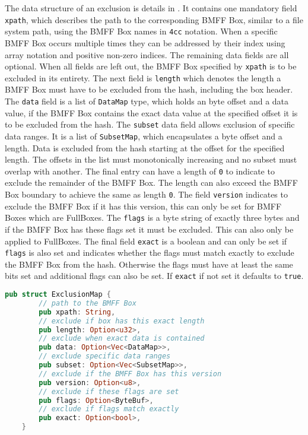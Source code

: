 The data structure of an exclusion is details in . It contains one mandatory field \texttt{xpath}, which describes the path to the corresponding BMFF Box, similar to a file system path, using the BMFF Box names in \texttt{4cc} notation. When a specific BMFF Box occurs multiple times they can be addressed by their index using array notation and positive non-zero indices. The remaining data fields are all optional. When all fields are left out, the BMFF Box specified by \texttt{xpath} is to be excluded in its entirety. The next field is \texttt{length} which denotes the length a BMFF Box must have to be excluded from the hash, including the box header. The \texttt{data} field is a list of \texttt{DataMap} type, which holds an byte offset and a data value, if the BMFF Box contains the exact data value at the specified offset it is to be excluded from the hash. The \texttt{subset} data field allows exclusion of specific data ranges. It is a list of \texttt{SubsetMap}, which encapsulates a byte offset and a length. Data is excluded from the hash starting at the offset for the specified length. The offsets in the list must monotonically increasing and no subset must overlap with another. The final entry can have a length of \texttt{0} to indicate to exclude the remainder of the BMFF Box. The length can also exceed the BMFF Box boundary to achieve the same as length \texttt{0}. The field \texttt{version} indicates to exclude the BMFF Box if it has this version, this can only be set for BMFF Boxes which are FullBoxes. The \texttt{flags} is a byte string of exactly three bytes and if the BMFF Box has these flags set it must be excluded. This can also only be applied to FullBoxes. The final field \texttt{exact} is a boolean and can only be set if \texttt{flags} is also set and indicates whether the flags must match exactly to exclude the BMFF Box from the hash. Otherwise the flags must have at least the same bits set and additional flags can also be set. If \texttt{exact} if not set it defaults to \texttt{true}.

\begin{minipage}{0.95\linewidth}
\begin{lstlisting}[caption={ExclusionMap Rust Definition}, label=code:exclusion_map, language=Rust, captionpos=b]
    pub struct ExclusionMap {
        // path to the BMFF Box
        pub xpath: String,
        // exclude if box has this exact length
        pub length: Option<u32>,
        // exclude when exact data is contained
        pub data: Option<Vec<DataMap>>,
        // exclude specific data ranges
        pub subset: Option<Vec<SubsetMap>>,
        // exclude if the BMFF Box has this version
        pub version: Option<u8>,
        // exclude if these flags are set
        pub flags: Option<ByteBuf>,
        // exclude if flags match exactly
        pub exact: Option<bool>,
    }
\end{lstlisting}
\end{minipage}

